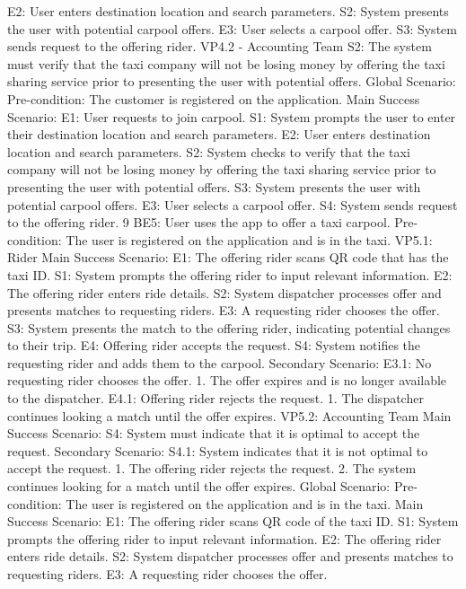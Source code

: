 E2: User enters destination location and search parameters.
S2: System presents the user with potential carpool offers.
E3: User selects a carpool offer.
S3: System sends request to the offering rider.
VP4.2 - Accounting Team
S2: The system must verify that the taxi company will not be losing money by offering the taxi
sharing service prior to presenting the user with potential offers.
Global Scenario:
Pre-condition: The customer is registered on the application.
Main Success Scenario:
E1: User requests to join carpool.
S1: System prompts the user to enter their destination location and search parameters.
E2: User enters destination location and search parameters.
S2: System checks to verify that the taxi company will not be losing money by offering the taxi
sharing service prior to presenting the user with potential offers.
S3: System presents the user with potential carpool offers.
E3: User selects a carpool offer.
S4: System sends request to the offering rider.
9
BE5: User uses the app to offer a taxi carpool.
Pre-condition: The user is registered on the application and is in the taxi.
VP5.1: Rider
Main Success Scenario:
E1: The offering rider scans QR code that has the taxi ID.
S1: System prompts the offering rider to input relevant information.
E2: The offering rider enters ride details.
S2: System dispatcher processes offer and presents matches to requesting riders.
E3: A requesting rider chooses the offer.
S3: System presents the match to the offering rider, indicating potential changes to their trip.
E4: Offering rider accepts the request.
S4: System notifies the requesting rider and adds them to the carpool.
Secondary Scenario:
E3.1: No requesting rider chooses the offer.
1. The offer expires and is no longer available to the dispatcher.
E4.1: Offering rider rejects the request.
1. The dispatcher continues looking a match until the offer expires.
VP5.2: Accounting Team
Main Success Scenario:
S4: System must indicate that it is optimal to accept the request.
Secondary Scenario:
S4.1: System indicates that it is not optimal to accept the request.
1. The offering rider rejects the request.
2. The system continues looking for a match until the offer expires.
Global Scenario:
Pre-condition: The user is registered on the application and is in the taxi.
Main Success Scenario:
E1: The offering rider scans QR code of the taxi ID.
S1: System prompts the offering rider to input relevant information.
E2: The offering rider enters ride details.
S2: System dispatcher processes offer and presents matches to requesting riders.
E3: A requesting rider chooses the offer.
